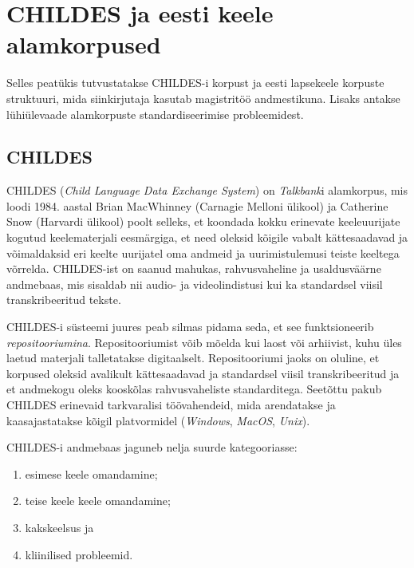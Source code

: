 \documentclass[12pt]{article}
\begin{document}
\newpage
\section{CHILDES ja eesti keele alamkorpused}

Selles peatükis tutvustatakse CHILDES-i korpust ja eesti lapsekeele korpuste struktuuri, mida siinkirjutaja kasutab magistritöö andmestikuna. Lisaks antakse lühiülevaade alamkorpuste standardiseerimise probleemidest.

\subsection{CHILDES}
CHILDES (\emph{Child Language Data Exchange System}) on \emph{Talkbank}i alamkorpus, mis loodi 1984. aastal Brian MacWhinney (Carnagie Melloni ülikool) ja Catherine Snow (Harvardi ülikool) poolt selleks, et koondada kokku erinevate keeleuurijate kogutud keelematerjali eesmärgiga, et need oleksid kõigile vabalt kättesaadavad ja võimaldaksid eri keelte uurijatel oma andmeid ja uurimistulemusi teiste keeltega võrrelda. CHILDES-ist on saanud mahukas, rahvusvaheline ja usaldusväärne andmebaas, mis sisaldab nii audio- ja videolindistusi kui ka standardsel viisil transkribeeritud tekste. \citep[1]{Gillis}

CHILDES-i süsteemi juures peab silmas pidama seda, et see funktsioneerib \emph{repositooriumina}. Repositooriumist võib mõelda kui laost või arhiivist, kuhu üles laetud materjali talletatakse digitaalselt. Repositooriumi jaoks on oluline, et korpused oleksid avalikult kättesaadavad ja standardsel viisil transkribeeritud ja et andmekogu oleks kooskõlas rahvusvaheliste standarditega. Seetõttu pakub CHILDES erinevaid tarkvaralisi töövahendeid, mida arendatakse ja kaasajastatakse kõigil platvormidel (\emph{Windows}, \emph{MacOS}, \emph{Unix}). \citep[1]{Gillis}

CHILDES-i andmebaas jaguneb nelja suurde kategooriasse:
\begin{enumerate}
    \item esimese keele omandamine;
    \item teise keele keele omandamine;
    \item kakskeelsus ja 
    \item kliinilised probleemid. \citep[1]{Gillis}
\end{enumerate}
\end{document}
